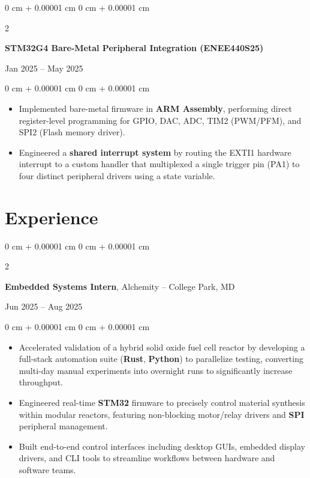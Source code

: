 \documentclass[10pt, letterpaper]{article}
\newenvironment{highlights}{
    \begin{itemize}[
        topsep=0.05 cm,
        parsep=0.05 cm,
        partopsep=0pt,
        itemsep=0pt,
        leftmargin=0 cm + 10pt
    ]
}{
    \end{itemize}
}
\newenvironment{onecolentry}{
    \begin{adjustwidth}{
        0 cm + 0.00001 cm
    }{
        0 cm + 0.00001 cm
    }
}{
    \end{adjustwidth}
}
\newenvironment{twocolentry}[2][]{
    \onecolentry
    \def\secondColumn{#2}
    \setcolumnwidth{\fill, 4.5 cm}
    \begin{paracol}{2}
}{
    \switchcolumn \raggedleft \secondColumn
    \end{paracol}
    \endonecolentry
}
\begin{document}
        \begin{twocolentry}{
            Jan 2025 – May 2025
        }
            \textbf{STM32G4 Bare-Metal Peripheral Integration (ENEE440S25)}
        \end{twocolentry}
        \vspace{0.05 cm}
        \begin{onecolentry}
            \begin{highlights}
                \item Implemented bare-metal firmware in \textbf{ARM Assembly}, performing direct register-level programming for GPIO, DAC, ADC, TIM2 (PWM/PFM), and SPI2 (Flash memory driver).
                \item Engineered a \textbf{shared interrupt system} by routing the EXTI1 hardware interrupt to a custom handler that multiplexed a single trigger pin (PA1) to four distinct peripheral drivers using a state variable.
            \end{highlights}
        \end{onecolentry}
    \section{Experience}
        
        \begin{twocolentry}{
            Jun 2025 – Aug 2025
        }
            \textbf{Embedded Systems Intern}, Alchemity -- College Park, MD
        \end{twocolentry}
        \vspace{0.05 cm}
        \begin{onecolentry}
            \begin{highlights}
                \item Accelerated validation of a hybrid solid oxide fuel cell reactor by developing a full-stack automation suite (\textbf{Rust}, \textbf{Python}) to parallelize testing, converting multi-day manual experiments into overnight runs to significantly increase throughput.
                \item Engineered real-time \textbf{STM32} firmware to precisely control material synthesis within modular reactors, featuring non-blocking motor/relay drivers and \textbf{SPI} peripheral management.
                \item Built end-to-end control interfaces including desktop GUIs, embedded display drivers, and CLI tools to streamline workflows between hardware and software teams.
            \end{highlights}
        \end{onecolentry}
\end{document}
